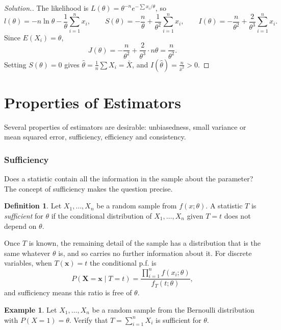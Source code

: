\documentclass[12pt,a4paper]{report}
\theoremstyle{definition}
\newtheorem{definition}[thm]{Definition}
\newtheorem{example}[thm]{Example}
\theoremstyle{plain}
\newenvironment{solution}
  {\renewcommand{\qedsymbol}{}\begin{proof}[\textit{Solution}.]}
  {\end{proof}}
\begin{document}
\begin{solution}
The likelihood is $L(\theta) = \theta^{-n}e^{-\sum x_i/\theta}$, so
\[l(\theta) = -n\ln \theta - \frac{1}{\theta}\sum^n_{i = 1} x_i ,\qquad
S(\theta) = -\frac{n}{\theta} + \frac{1}{\theta^2}\sum^n_{i = 1} x_i ,\qquad
I(\theta) = -\frac{n}{\theta^2} + \frac{2}{\theta^3}\sum^n_{i = 1} x_i .\]
Since $E(X_i) = \theta$,
\[J(\theta) = -\frac{n}{\theta^2} + \frac{2}{\theta^3}\cdot n\theta =
\frac{n}{\theta^2} .\]
Setting $S(\theta) = 0$ gives $\hat\theta = \frac1n\sum X_i = \bar X$, and
$I(\hat\theta) = \frac{n}{\bar x^2}>0$.
\end{solution}

\section{Properties of Estimators}

Several properties of estimators are desirable: unbiasedness, small variance or
mean squared error, sufficiency, efficiency and consistency.

\subsubsection{Sufficiency}

Does a statistic contain all the information in the sample about the parameter?
The concept of sufficiency makes the question precise.

\begin{definition}
\label{def:sufficient}
Let $X_1, \dots, X_n$ be a random sample from $f(x;\theta)$. A statistic $T$ is
\emph{sufficient} for $\theta$ if the conditional distribution of
$X_1, \dots , X_n$ given $T = t$ does not depend on $\theta$.
\end{definition}

Once $T$ is known, the remaining detail of the sample has a distribution that is
the same whatever $\theta$ is, and so carries no further information about it.
For discrete variables, when $T(\mathbf x) = t$ the conditional p.f. is
\[P(\mathbf X = \mathbf x\mid T = t) = \frac{\prod_{i=1}^nf(x_i;\theta)}{f_T(t;
\theta)} ,\]
and sufficiency means this ratio is free of $\theta$.

\begin{example}
\label{ex:sufficientbernoulli}
Let $X_1, \dots , X_n$ be a random sample from the Bernoulli distribution with
$P(X = 1) = \theta$. Verify that $T = \sum^n_{i = 1}X_i$ is sufficient for
$\theta$.
\end{example}
\end{document}
